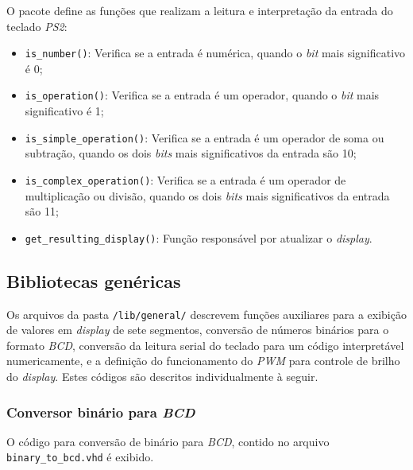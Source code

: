\documentclass[a4paper,11pt]{article}
\begin{document}
O pacote define as funções que realizam a leitura e interpretação da entrada do teclado \textit{PS2}:

\begin{itemize}
	\item \texttt{is_number()}: Verifica se a entrada é numérica, quando o \textit{bit} mais significativo é 0;
	\item \texttt{is_operation()}: Verifica se a entrada é um operador, quando o \textit{bit} mais significativo é 1;
	\item \texttt{is_simple_operation()}: Verifica se a entrada é um operador de soma ou subtração, quando os dois \textit{bits} mais significativos da entrada são 10;
	\item \texttt{is_complex_operation()}: Verifica se a entrada é um operador de multiplicação ou divisão, quando os dois \textit{bits} mais significativos da entrada são 11;
	\item \texttt{get_resulting_display()}: Função responsável por atualizar o \textit{display}.
\end{itemize}

\subsection{Bibliotecas genéricas} \label{sec:apend_generic}

Os arquivos da pasta \texttt{/lib/general/} descrevem funções auxiliares para a exibição de valores em \textit{display} de sete segmentos, conversão de números binários para o formato \textit{BCD}, conversão da leitura serial do teclado para um código interpretável numericamente, e a definição do funcionamento do \textit{PWM} para controle de brilho do \textit{display}. Estes códigos são descritos individualmente à seguir.

\subsubsection{Conversor binário para \textit{BCD}} \label{sec:apend_bin_bcd}

O código para conversão de binário para \textit{BCD}, contido no arquivo \texttt{binary_to_bcd.vhd} é exibido.
\end{document}

